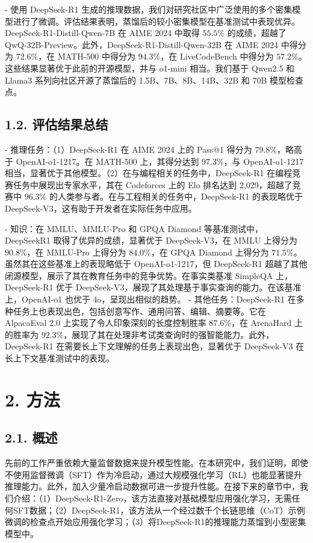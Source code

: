 \documentclass[12pt,a4paper]{report} %
\begin{document}
- 使用 DeepSeek-R1 生成的推理数据，我们对研究社区中广泛使用的多个密集模型进行了微调。评估结果表明，蒸馏后的较小密集模型在基准测试中表现优异。DeepSeek-R1-Distill-Qwen-7B 在 AIME 2024 中取得 $55.5 \%$ 的成绩，超越了 QwQ-32B-Preview。此外，DeepSeek-R1-Distill-Qwen-32B 在 AIME 2024 中得分为 $72.6 \%$，在 MATH-500 中得分为 $94.3 \%$，在 LiveCodeBench 中得分为 $57.2 \%$。这些结果显著优于此前的开源模型，并与 o1-mini 相当。我们基于 Qwen2.5 和 Llama3 系列向社区开源了蒸馏后的 1.5B、7B、8B、14B、32B 和 70B 模型检查点。


\subsection*{1.2. 评估结果总结}


- 推理任务：（1）DeepSeek-R1 在 AIME 2024 上的 Pass@1 得分为 $79.8 \%$，略高于 OpenAI-o1-1217。在 MATH-500 上，其得分达到 $97.3 \%$，与 OpenAI-o1-1217 相当，显著优于其他模型。（2）在与编程相关的任务中，DeepSeek-R1 在编程竞赛任务中展现出专家水平，其在 Codeforces 上的 Elo 排名达到 2,029，超越了竞赛中 $96.3 \%$ 的人类参与者。在与工程相关的任务中，DeepSeek-R1 的表现略优于 DeepSeek-V3，这有助于开发者在实际任务中应用。


- 知识：在 MMLU、MMLU-Pro 和 GPQA Diamond 等基准测试中，DeepSeekR1 取得了优异的成绩，显著优于 DeepSeek-V3，在 MMLU 上得分为 $90.8 \%$，在 MMLU-Pro 上得分为 $84.0 \%$，在 GPQA Diamond 上得分为 $71.5 \%$。虽然其在这些基准上的表现略低于 OpenAI-o1-1217，但 DeepSeek-R1 超越了其他闭源模型，展示了其在教育任务中的竞争优势。在事实类基准 SimpleQA 上，DeepSeek-R1 优于 DeepSeek-V3，展现了其处理基于事实查询的能力。在该基准上，OpenAI-o1 也优于 4o，呈现出相似的趋势。
- 其他任务：DeepSeek-R1 在多种任务上也表现出色，包括创意写作、通用问答、编辑、摘要等。它在 AlpacaEval 2.0 上实现了令人印象深刻的长度控制胜率 $87.6 \%$，在 ArenaHard 上的胜率为 $92.3 \%$，展现了其在处理非考试类查询时的强智能能力。此外，DeepSeek-R1 在需要长上下文理解的任务上表现出色，显著优于 DeepSeek-V3 在长上下文基准测试中的表现。


\section*{2. 方法}


\subsection*{2.1. 概述}


先前的工作严重依赖大量监督数据来提升模型性能。在本研究中，我们证明，即使不使用监督微调（SFT）作为冷启动，通过大规模强化学习（RL）也能显著提升推理能力。此外，加入少量冷启动数据可进一步提升性能。在接下来的章节中，我们介绍：（1）DeepSeek-R1-Zero，该方法直接对基础模型应用强化学习，无需任何SFT数据；（2）DeepSeek-R1，该方法从一个经过数千个长链思维（CoT）示例微调的检查点开始应用强化学习；（3）将DeepSeek-R1的推理能力蒸馏到小型密集模型中。
\end{document}

